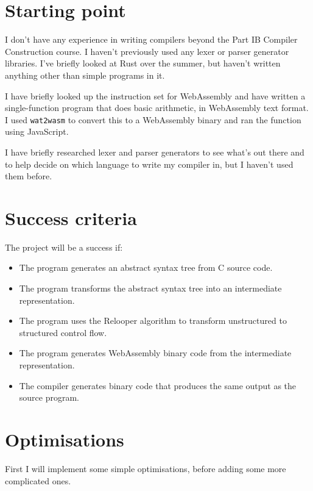 \documentclass[12pt,a4paper]{article}
\begin{document}



\section*{Starting point}

I don't have any experience in writing compilers beyond the Part IB Compiler Construction course. I haven't previously used any lexer or parser generator libraries.
I've briefly looked at Rust over the summer, but haven't written anything other than simple programs in it.

I have briefly looked up the instruction set for WebAssembly and have written a single-function program that does basic arithmetic, in WebAssembly text format. I used \texttt{wat2wasm} to convert this to a WebAssembly binary and ran the function using JavaScript.

I have briefly researched lexer and parser generators to see what's out there and to help decide on which language to write my compiler in, but I haven't used them before.

\section*{Success criteria}

The project will be a success if:

\begin{itemize}
\item The program generates an abstract syntax tree from C source code.
\item The program transforms the abstract syntax tree into an intermediate representation.
\item The program uses the Relooper algorithm to transform unstructured to structured control flow.
\item The program generates WebAssembly binary code from the intermediate representation.
\item The compiler generates binary code that produces the same output as the source program.
\end{itemize}


\section*{Optimisations}

First I will implement some simple optimisations, before adding some more complicated ones.
\end{document}

